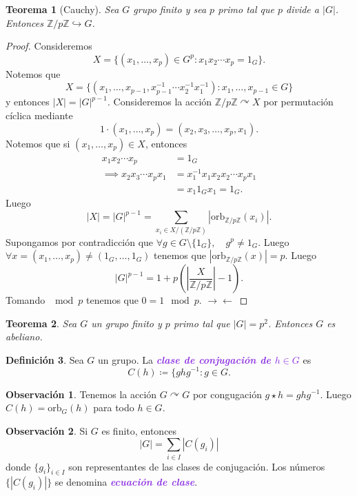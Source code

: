 \documentclass{article}
\newtheorem{theorem}{Teorema}[subsection]
\theoremstyle{definition}
\newtheorem{definition}[theorem]{Definición}
\newtheorem*{obs}{Observación}
\theoremstyle{remark}
\numberwithin{equation}{section}
\newcommand{\Z}{\mathbb{Z}}
\newcommand{\embed}{\hookrightarrow}
\newcommand{\acts}{\curvearrowright}
\renewcommand{\c}{\cdot}
\newcommand{\orb}{\mathrm{orb}}
\newcommand{\abs}[1]{\left| #1 \right|}
\newcommand{\br}[1]{\left( #1 \right)}
\newcommand{\zmz}[1]{\Z/ #1 \Z}
\newcommand{\wea}[1]{\textcolor{BlueViolet}{\textbf{\emph{#1}}}}
\begin{document}
\begin{theorem}
  [Cauchy]
  Sea $G$ grupo finito y sea $p$ primo tal que $p$ divide a $\abs G$. Entonces $\zmz p \embed G$.
\end{theorem}
\begin{proof}
  Consideremos $$X = \{(x_1,\dots,x_p) \in G^p \colon x_1 x_2 \cdots x_p = 1_G\}.$$
  Notemos que $$X = \{(x_1,\dots,x_{p-1}, x_{p-1}^{-1}\cdots x_2^{-1}x_1^{-1}) \colon x_1,\dots,x_{p-1} \in G\}$$ y entonces $\abs X = \abs G^{p-1}$.
  Consideremos la acción $\zmz p \acts X$ por permutación cíclica mediante $$1 \c (x_1,\dots,x_p) = (x_2,x_3, \dots, x_p, x_1).$$
  Notemos que si $(x_1,\dots,x_p) \in X$, entonces
  \begin{align*}
    x_1 x_2 \cdots x_p &= 1_G \\
    \implies x_2 x_3 \cdots x_p x_1 &= x_1^{-1} x_1 x_2 x_2 \cdots x_p x_1 \\
    &= x_1 1_G x_1 = 1_G.
  \end{align*}
  Luego
  \[\abs{X} = \abs{G}^{p-1} = \sum_{x_i \in X/(\Z/p\Z)} |\orb_{\Z/p\Z} (x_i)|.\] %
  Supongamos por contradicción que $\forall g \in G \setminus \{1_G\}, \quad g^p \neq 1_G$.
  Luego $\forall x = (x_1,\dots,x_p) \neq (1_G,\dots,1_G)$ tenemos que $\abs{\orb_{\zmz p}(x)} = p$. Luego
  \[\abs G^{p-1} = 1 + p \br{\abs{\frac{X}{\zmz p}} -1}.\]
  Tomando $\mod p$ tenemos que $0=1 \mod p$. $\to\gets$
\end{proof}

\begin{theorem}
  Sea $G$ un grupo finito y $p$ primo tal que $\abs G = p^2$. Entonces $G$ es abeliano.
\end{theorem}

\begin{definition}
  Sea $G$ un grupo. La \wea{clase de conjugación de $h \in G$} es
  \[C(h) \coloneqq \{ghg^{-1} \colon g \in G.\]
\end{definition}

\begin{obs}
  Tenemos la acción $G \acts G$ por congugación $g \star h = ghg^{-1}$. Luego $C(h) = \orb_G(h)$ para todo $h \in G$.
\end{obs}

\begin{obs}
  Si $G$ es finito, entonces $$\abs G = \sum_{i \in I} \abs{C(g_i)}$$ donde $\{g_i\}_{i \in I}$ son representantes de las clases de conjugación. Los números $\{\abs{C(g_i)}\}$ se denomina \wea{ecuación de clase}.
\end{obs}
\end{document}
